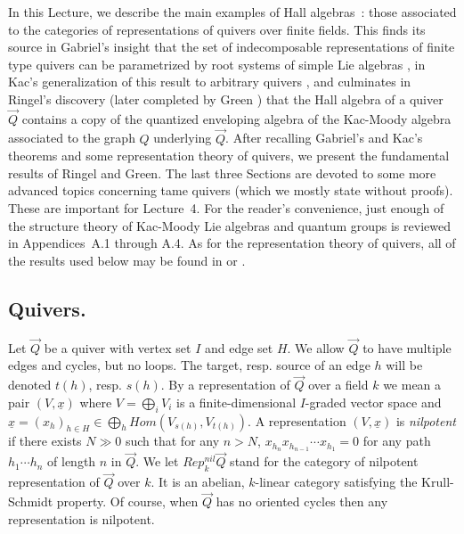 \documentclass[a4paper,10pt]{amsart}
\numberwithin{equation}{section}
\begin{document}
\setcounter{section}{3}
\setcounter{theo}{0}
\setcounter{equation}{0}

\vspace{.15in}

In this Lecture, we describe the main examples of Hall algebras~: those associated to the categories of representations of quivers over finite fields. This finds its source in Gabriel's insight that the set of indecomposable representations of finite type quivers can be parametrized by root systems of simple Lie algebras \cite{Gabriel}, in Kac's generalization of this result to arbitrary quivers \cite{Kac}, and culminates in Ringel's discovery \cite{Ri} (later completed by Green \cite{Green}) that the Hall algebra of a quiver $\vec{Q}$ contains a copy of the quantized enveloping algebra of the Kac-Moody algebra associated to the graph $Q$ underlying $\vec{Q}$. After recalling Gabriel's and Kac's theorems and some representation theory of quivers, we present the fundamental results of Ringel and Green. The last three Sections are devoted to some more advanced topics concerning tame quivers (which we mostly state without proofs). These are important for Lecture~4.
For the reader's convenience,  just enough of the structure theory of Kac-Moody Lie algebras and quantum groups is reviewed in Appendices~A.1 through A.4. As for the representation theory of quivers, all of the results used below may be found in \cite{Barot} or \cite{CrawleyNotes}.

\vspace{.2in}

\subsection{Quivers.}

\vspace{.15in}

Let $\vec{Q}$ be a quiver with vertex set $I$ and edge set $H$. We allow $\vec{Q}$ to have multiple edges and cycles, but no loops. The target, resp. source of an edge $h$ will be denoted $t(h)$, resp. $s(h)$. By a representation of $\vec{Q}$ over a field $k$ we mean a pair $(V,\underline{x})$ where $V=\bigoplus_i V_i$ is a finite-dimensional $I$-graded vector space and $\underline{x}=(x_h)_{h \in H} \in \bigoplus_h {Hom}(V_{s(h)},V_{t(h)})$. A representation $(V,\underline{x})$ is \textit{nilpotent} if there exists $N \gg 0$ such that for any $n >N$, $x_{h_n}x_{h_{n-1}} \cdots x_{h_1}=0$ for any path $h_1 \cdots h_n$ of length $n$ in $\vec{Q}$. We let $Rep^{nil}_k\vec{Q}$ stand for the category of nilpotent representation of $\vec{Q}$ over $k$. It is an abelian, $k$-linear category satisfying the Krull-Schmidt property. Of course, when $\vec{Q}$ has no oriented cycles then any representation is nilpotent.
\end{document}
